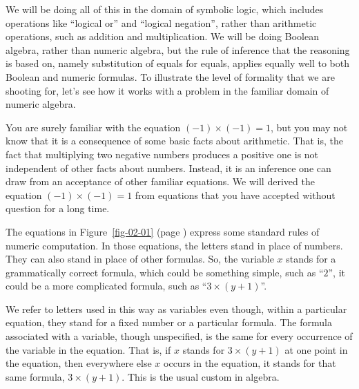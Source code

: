 We will be doing all of this in the domain of symbolic logic, which
includes operations like ``logical or'' and ``logical negation'',
rather than arithmetic operations, such as addition and
multiplication.
We will be doing Boolean algebra, rather than numeric algebra,
but the rule of inference that the reasoning is based on, namely
substitution of equals for equals,
applies equally well to both Boolean and numeric formulas.
To illustrate the level of formality that we are shooting for,
let's see how it works with a problem
in the familiar domain of numeric algebra.

You are surely familiar with the equation $(-1)\times(-1) = 1$, but you may
not know that it is a consequence of some basic facts about
arithmetic.
That is, the fact that multiplying two
negative numbers produces a positive one
is not independent of other facts about numbers.
Instead, it is an inference one can draw
from an acceptance of other familiar equations.
We will derived the equation $(-1)\times(-1) = 1$
from equations that you have accepted without question for a long time.

The equations in Figure~\ref{fig-02-01} (page \pageref{fig-02-01})
express some standard rules of numeric computation.
In those equations, the letters stand in
place of numbers. They can also stand in place of other
formulas.
So, the variable $x$ stands for a grammatically correct formula,
which could be something simple, such as ``$2$'',
it could be a more complicated formula, such as ``$3\times(y + 1)$''.

We refer to letters used in this way as
variables even though, within a particular equation, they
stand for a fixed number or a particular formula.
The formula associated with a variable, though unspecified,
is the same for every occurrence of the variable in the equation.
That is, if $x$ stands for $3\times(y + 1)$ at one point in the
equation, then everywhere else $x$ occurs in the equation,
it stands for that same formula, $3\times(y + 1)$.
This is the usual custom in algebra.

